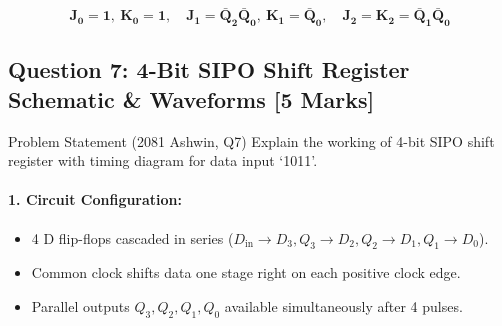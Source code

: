 \documentclass[11pt,a4paper,oneside]{book}
\begin{document}
\begin{answerbox}
$$\mathbf{J_0 = 1, \ K_0 = 1, \quad J_1 = \bar{Q}_2\bar{Q}_0, \ K_1 = \bar{Q}_0, \quad J_2 = K_2 = \bar{Q}_1\bar{Q}_0}$$
\end{answerbox}

\vspace{0.6cm}

\subsection{Question 7: 4-Bit SIPO Shift Register Schematic \& Waveforms [5 Marks]}
\begin{questionbox}{Problem Statement (2081 Ashwin, Q7)}
Explain the working of 4-bit SIPO shift register with timing diagram for data input `1011'.
\end{questionbox}

\paragraph{1. Circuit Configuration:}
\begin{itemize}
  \item 4 D flip-flops cascaded in series ($D_{\text{in}} \to D_3, Q_3 \to D_2, Q_2 \to D_1, Q_1 \to D_0$).
  \item Common clock shifts data one stage right on each positive clock edge.
  \item Parallel outputs $Q_3, Q_2, Q_1, Q_0$ available simultaneously after 4 pulses.
\end{itemize}
\end{document}
